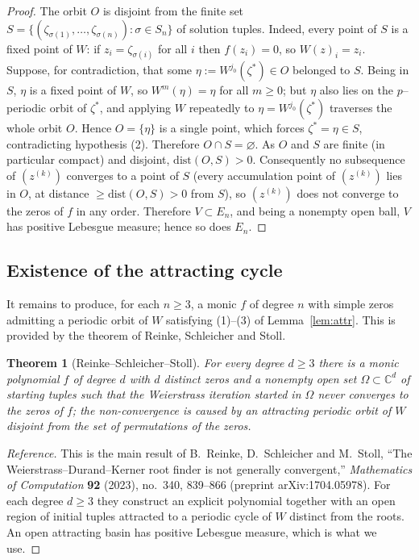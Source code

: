 \documentclass{amsart}
\newtheorem{theorem}{Theorem}
\theoremstyle{definition}
\theoremstyle{remark}
\newcommand{\C}{\mathbb{C}}
\begin{document}
\begin{proof}
The orbit $O$ is disjoint from the finite set
$S=\{(\zeta_{\sigma(1)},\dots,\zeta_{\sigma(n)}):\sigma\in S_n\}$ of solution tuples. Indeed,
every point of $S$ is a fixed point of $W$: if $z_i=\zeta_{\sigma(i)}$ for all $i$ then
$f(z_i)=0$, so $W(z)_i=z_i$. Suppose, for contradiction, that some
$\eta:=W^{j_0}(\zeta^{*})\in O$ belonged to $S$. Being in $S$, $\eta$ is a fixed point of
$W$, so $W^{m}(\eta)=\eta$ for all $m\ge0$; but $\eta$ also lies on the $p$--periodic orbit of
$\zeta^{*}$, and applying $W$ repeatedly to $\eta=W^{j_0}(\zeta^{*})$ traverses the whole
orbit $O$. Hence $O=\{\eta\}$ is a single point, which forces $\zeta^{*}=\eta\in S$,
contradicting hypothesis (2). Therefore $O\cap S=\varnothing$. As $O$ and $S$ are finite (in
particular compact) and disjoint, $\mathrm{dist}(O,S)>0$. Consequently no subsequence of
$(z^{(k)})$ converges to a point of $S$ (every accumulation point of $(z^{(k)})$ lies in $O$,
at distance $\ge\mathrm{dist}(O,S)>0$ from $S$), so $(z^{(k)})$ does not converge to the zeros
of $f$ in any order. Therefore $V\subset E_n$, and being a nonempty open ball, $V$ has
positive Lebesgue measure; hence so does $E_n$.
\end{proof}

\subsection{Existence of the attracting cycle}

It remains to produce, for each $n\ge3$, a monic $f$ of degree $n$ with simple zeros
admitting a periodic orbit of $W$ satisfying (1)--(3) of Lemma~\ref{lem:attr}. This is
provided by the theorem of Reinke, Schleicher and Stoll.

\begin{theorem}[Reinke--Schleicher--Stoll]\label{thm:rss}
For every degree $d\ge3$ there is a monic polynomial $f$ of degree $d$ with $d$ distinct
zeros and a nonempty open set $\Omega\subset\C^{d}$ of starting tuples such that the
Weierstrass iteration started in $\Omega$ never converges to the zeros of $f$; the
non-convergence is caused by an attracting periodic orbit of $W$ disjoint from the set of
permutations of the zeros.
\end{theorem}

\begin{proof}[Reference]
This is the main result of B.~Reinke, D.~Schleicher and M.~Stoll, ``The
Weierstrass--Durand--Kerner root finder is not generally convergent,'' \emph{Mathematics of
Computation} \textbf{92} (2023), no.\ 340, 839--866 (preprint arXiv:1704.05978). For each
degree $d\ge3$ they construct an explicit polynomial together with an open region of initial
tuples attracted to a periodic cycle of $W$ distinct from the roots. An open attracting basin
has positive Lebesgue measure, which is what we use.
\end{proof}
\end{document}
